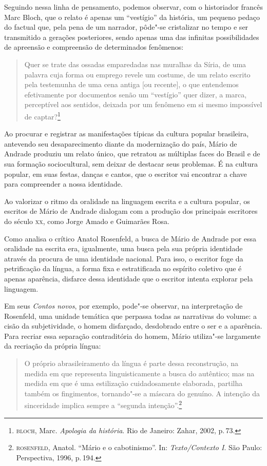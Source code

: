 Seguindo nessa linha de pensamento, podemos observar, com o historiador francês Marc Bloch, que o relato é apenas um ``vestígio'' da história, um pequeno pedaço do factual que, pela pena de um narrador, pôde"-se cristalizar no tempo e ser transmitido a gerações posteriores, sendo apenas uma das infinitas possibilidades de apreensão e compreensão de determinados fenômenos:

\begin{quote}
Quer se trate das ossadas
emparedadas nas muralhas da Síria, de uma palavra cuja forma ou emprego revele um
costume, de um relato escrito pela testemunha de uma cena antiga [ou recente], o que
entendemos efetivamente por documentos senão um ``vestígio'' quer dizer, a marca,
perceptível aos sentidos, deixada por um fenômeno em si mesmo impossível de captar?\footnote{\textsc{bloch}, Marc. \textit{Apologia da história}. Rio de Janeiro: Zahar, 2002, p.\,73.}
\end{quote}

Ao procurar e registrar as manifestações típicas da cultura popular brasileira, antevendo seu desaparecimento diante da modernização do país, Mário de Andrade produziu um relato único, que retratou as múltiplas faces do Brasil e de sua formação sociocultural, sem deixar de destacar seus problemas.
É na cultura popular, em suas festas, danças e cantos, que o escritor vai encontrar a chave para compreender a nossa identidade.

Ao valorizar o ritmo da oralidade na linguagem escrita e a cultura
popular, os escritos de Mário de Andrade dialogam com a produção dos
principais escritores do século \textsc{xx}, como Jorge Amado e Guimarães Rosa.

Como analisa o crítico Anatol Rosenfeld, a busca de Mário de Andrade por essa oralidade na escrita era, igualmente, uma busca pela sua própria identidade através da procura de uma identidade nacional. Para isso, o escritor foge da petrificação da língua, a forma fixa e estratificada no espírito coletivo que é apenas aparência, disfarce dessa identidade que o escritor intenta explorar pela linguagem.

Em seus \textit{Contos novos}, por exemplo, pode"-se observar, na interpretação de Rosenfeld, uma unidade temática que perpassa todas as narrativas do volume: a cisão da subjetividade, o homem disfarçado, desdobrado entre o ser e a aparência.
Para recriar essa separação contraditória do homem, Mário utiliza"-se largamente da recriação da própria língua:

\begin{quote}
O próprio abrasileiramento da língua é parte dessa reconstrução, na medida em que representa linguisticamente a busca do autêntico; mas na medida em que é uma estilização cuidadosamente elaborada, partilha também os fingimentos, tornando"-se a máscara do genuíno. A intenção da sinceridade implica sempre a ``segunda intenção''.\footnote{\textsc{rosenfeld}, Anatol. ``Mário e o cabotinismo''. In: \textit{Texto/Contexto I}. São Paulo: Perspectiva, 1996, p.\,194.}
\end{quote}

